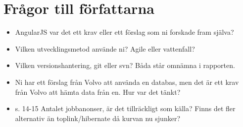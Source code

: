 \section{Frågor till författarna} %
\label{sec:fr_gor_till_f_rfattarna}

\begin{itemize}
    \item AngularJS var det ett krav eller ett förslag som ni forskade fram själva?
    \item Vilken utvecklingsmetod använde ni? Agile eller vattenfall?
    \item Vilken versionshantering, git eller svn? Båda står omnämna i rapporten.
    \item Ni har ett förslag från Volvo att använda en databas, men det är ett krav från Volvo att hämta data från en. Hur var det tänkt?
    \item s. 14-15 Antalet jobbanonser, är det tillräckligt som källa? Finns det fler alternativ än toplink/hibernate då kurvan nu sjunker?
\end{itemize}

